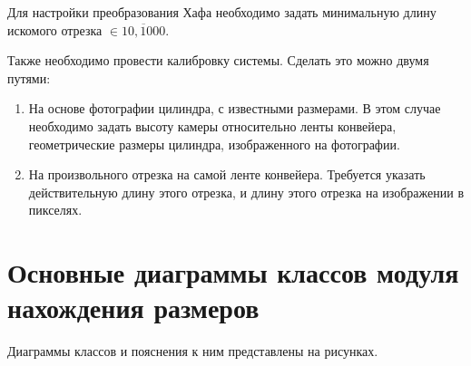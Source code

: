 Для настройки преобразования Хафа необходимо задать минимальную длину искомого отрезка \(\in \overline{10,1000}\).

Также необходимо провести калибровку системы. Сделать это можно двумя путями:
\begin{enumerate}
	\item На основе фотографии цилиндра, с известными размерами. В этом случае необходимо задать высоту камеры относительно ленты конвейера, геометрические размеры цилиндра, изображенного на фотографии.
	\item На произвольного отрезка на самой ленте конвейера. Требуется указать действительную длину этого отрезка, и длину этого отрезка на изображении в пикселях.
\end{enumerate}

\section{Основные диаграммы классов модуля нахождения размеров}
Диаграммы классов и пояснения к ним представлены на рисунках.

